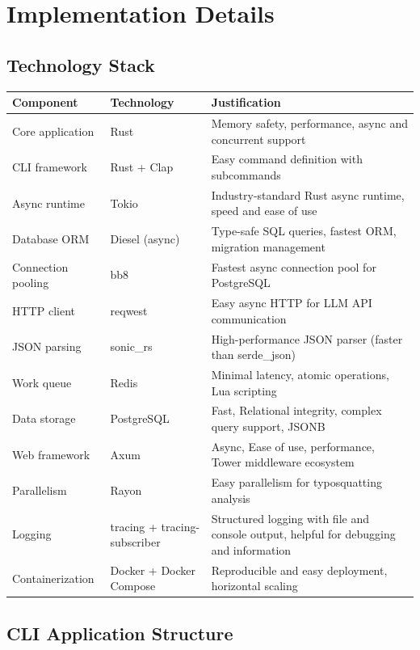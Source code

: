 \chapter{Implementation Details}\label{chapter:chap6}

\section{Technology Stack}\label{sect:tech-stack}

\begin{tabularx}{\textwidth}{|l|l|X|}
\hline
\textbf{Component} & \textbf{Technology} & \textbf{Justification} \\
\hline
Core application & Rust & Memory safety, performance, async and concurrent support \\
\hline
CLI framework & Rust + Clap & Easy command definition with subcommands \\
\hline
Async runtime & Tokio & Industry-standard Rust async runtime, speed and ease of use \\
\hline
Database ORM & Diesel (async) & Type-safe SQL queries, fastest ORM, migration management \\
\hline
Connection pooling & bb8 & Fastest async connection pool for PostgreSQL \\
\hline
HTTP client & reqwest & Easy async HTTP for LLM API communication \\
\hline
JSON parsing & sonic\_rs & High-performance JSON parser (faster than serde\_json) \\
\hline
Work queue & Redis & Minimal latency, atomic operations, Lua scripting \\
\hline
Data storage & PostgreSQL & Fast, Relational integrity, complex query support, JSONB \\
\hline
Web framework & Axum & Async, Ease of use, performance, Tower middleware ecosystem \\
\hline
Parallelism & Rayon & Easy parallelism for typosquatting analysis \\
\hline
Logging & tracing + tracing-subscriber & Structured logging with file and console output, helpful for debugging and information \\
\hline
Containerization & Docker + Docker Compose & Reproducible and easy deployment, horizontal scaling \\
\hline
\end{tabularx}

\section{CLI Application Structure}\label{sect:cli-structure}

